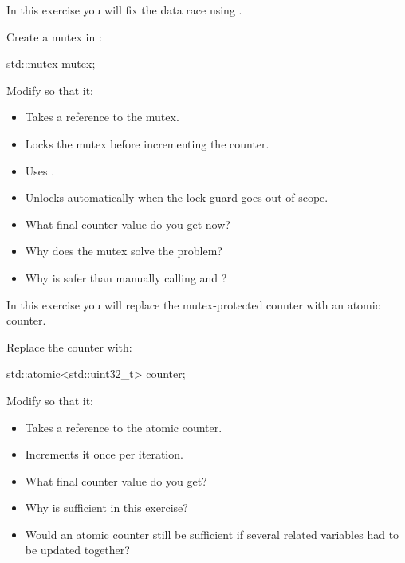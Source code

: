 \label{c6:ex:2.2}
In this exercise you will fix the data race using .

Create a mutex in :

\begin{cppcode}
std::mutex mutex{};
\end{cppcode}

\noindent Modify  so that it:
\begin{itemize}
  \item Takes a reference to the mutex.
  \item Locks the mutex before incrementing the counter.
  \item Uses .
  \item Unlocks automatically when the lock guard goes out of scope.
\end{itemize}

\begin{itemize}
  \item What final counter value do you get now?
  \item Why does the mutex solve the problem?
  \item Why is  safer than manually calling  and
    ?
\end{itemize}

\label{c6:ex:2.3}
In this exercise you will replace the mutex-protected counter with an atomic counter.

Replace the counter with:

\begin{cppcode}
std::atomic<std::uint32_t> counter{};
\end{cppcode}

\noindent Modify  so that it:
\begin{itemize}
  \item Takes a reference to the atomic counter.
  \item Increments it once per iteration.
\end{itemize}

\begin{itemize}
  \item What final counter value do you get?
  \item Why is  sufficient in this exercise?
  \item Would an atomic counter still be sufficient if several related variables had to be updated
    together?
\end{itemize}

